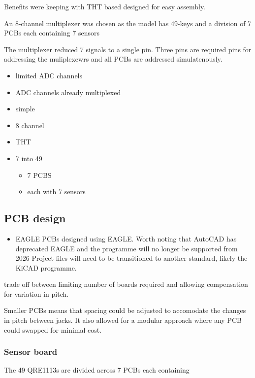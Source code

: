 Benefits were keeping with THT based designed for easy assembly.

An 8-channel multiplexer was chosen as the model has 49-keys and a
division of 7 PCBs each containing 7 sensors

The multiplexer reduced 7 signals to a single pin. Three pins are
required pins for addressing the muliplexewrs and all PCBs are addressed
simulatenously.

\begin{itemize}
\tightlist
\item
  limited ADC channels
\item
  ADC channels already multiplexed
\item
  simple
\item
  8 channel
\item
  THT
\item
  7 into 49

  \begin{itemize}
  \tightlist
  \item
    7 PCBS
  \item
    each with 7 sensors
  \end{itemize}
\end{itemize}

\subsection{PCB design}\label{pcb-design}

\begin{itemize}
\tightlist
\item
  EAGLE PCBs designed using EAGLE. Worth noting that AutoCAD has
  deprecated EAGLE and the programme will no longer be supported from
  2026 Project files will need to be transitioned to another standard,
  likely the KiCAD programme.
\end{itemize}

trade off between limiting number of boards required and allowing
compensation for variation in pitch.

Smaller PCBs means that spacing could be adjusted to accomodate the
changes in pitch between jacks. It also allowed for a modular approach
where any PCB could swapped for minimal cost.

\subsubsection{Sensor board}\label{sensor-board}

The 49 QRE1113s are divided across 7 PCBs each containing

